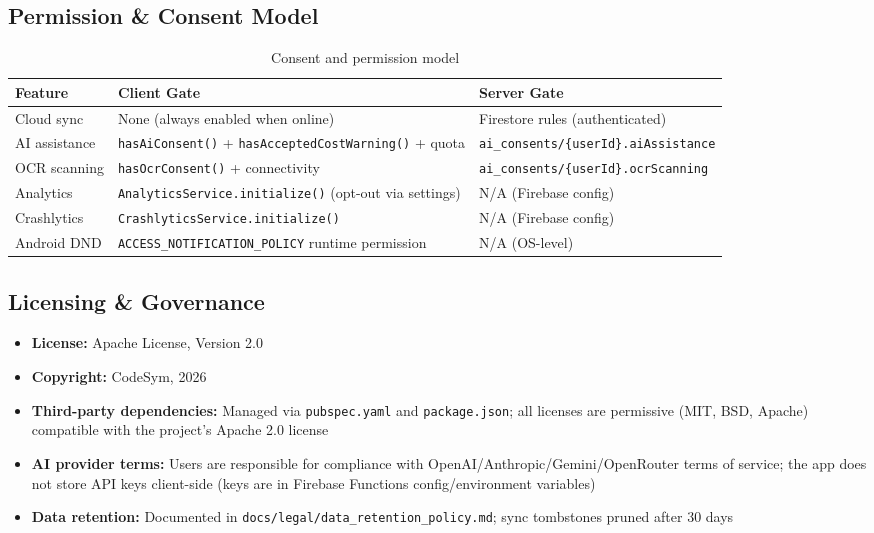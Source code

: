 \documentclass[12pt,a4paper,openany]{report}
\begin{document}
\subsection{Permission \& Consent Model}

\begin{table}[H]
\centering
\caption{Consent and permission model}
\label{tab:consent}
\begin{tabular}{lll}
\toprule
\textbf{Feature} & \textbf{Client Gate} & \textbf{Server Gate} \\
\midrule
Cloud sync & None (always enabled when online) & Firestore rules (authenticated) \\
AI assistance & \texttt{hasAiConsent()} + \texttt{hasAcceptedCostWarning()} + quota & \texttt{ai\_consents/\{userId\}.aiAssistance} \\
OCR scanning & \texttt{hasOcrConsent()} + connectivity & \texttt{ai\_consents/\{userId\}.ocrScanning} \\
Analytics & \texttt{AnalyticsService.initialize()} (opt-out via settings) & N/A (Firebase config) \\
Crashlytics & \texttt{CrashlyticsService.initialize()} & N/A (Firebase config) \\
Android DND & \texttt{ACCESS\_NOTIFICATION\_POLICY} runtime permission & N/A (OS-level) \\
\bottomrule
\end{tabular}
\end{table}

\subsection{Licensing \& Governance}

\begin{itemize}[leftmargin=*]
  \item \textbf{License:} Apache License, Version 2.0
  \item \textbf{Copyright:} CodeSym, 2026
  \item \textbf{Third-party dependencies:} Managed via \texttt{pubspec.yaml} and \texttt{package.json}; all licenses are permissive (MIT, BSD, Apache) compatible with the project's Apache 2.0 license
  \item \textbf{AI provider terms:} Users are responsible for compliance with OpenAI/Anthropic/Gemini/OpenRouter terms of service; the app does not store API keys client-side (keys are in Firebase Functions config/environment variables)
  \item \textbf{Data retention:} Documented in \texttt{docs/legal/data\_retention\_policy.md}; sync tombstones pruned after 30 days
\end{itemize}
\end{document}
